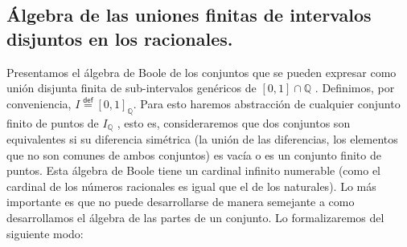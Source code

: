 \documentclass[final,12pt,a4paper,twoside,fleqn]{extbook}
\newcommand{\mathdef}{\ensuremath{\stackrel{\mathsf{def}}{{}={}}}}
\newcommand{\setQ}{\ensuremath{\mathds{Q}}}
\theoremstyle{definition}
\theoremstyle{remark}
\begin{document}
\subsection{Álgebra de las uniones finitas de intervalos disjuntos en los
racionales.}



	Presentamos el álgebra de Boole de los conjuntos que se pueden expresar
como unión disjunta finita de sub-intervalos genéricos de
\(\left[0,1\right]\cap\setQ\) . Definimos, por conveniencia, \(I \mathdef
{\left[ {0,1} \right]}_{\setQ} \). Para esto haremos abstracción de cualquier
conjunto finito de puntos de \(I_{\setQ}\) , esto es, consideraremos que dos
conjuntos son equivalentes si su diferencia simétrica (la unión de las
diferencias, los elementos que no son comunes de ambos conjuntos) es vacía o
es un conjunto finito de puntos. Esta álgebra de Boole tiene un cardinal
infinito numerable (como el cardinal de los números racionales es igual que
el de los naturales). Lo más importante es que no puede desarrollarse de
manera semejante a como desarrollamos el álgebra de las partes de un
conjunto. Lo formalizaremos del siguiente modo:



\newcommand {\powset}[1]{
	\ensuremath{
		\text{
			\large \(\mathscr{P}\) \normalsize 
				\( #1 \)
			}
		}
	}
\newcommand {\IQ} {\ensuremath{{\mathsf{I}}_{\setQ}}}
\newcommand {\IIQ} {\ensuremath{{\mathsf{I}\mathsf{I}}_{\setQ}}}
\newcommand {\IIIQ} {\ensuremath{{\mathsf{I}\mathsf{I}\mathsf{I}}_{\setQ}}}
\newcommand {\IVQ} {\ensuremath{{\mathsf{I}\mathsf{V}}_{\setQ}}}
\newcommand {\FinIQ} {\ensuremath{{\mathsf{Fin}}_{\IQ}}}
\newcommand {\FinDiffRel} {\ensuremath{\!\!\!\!\mod\FinIQ}}
\newcommand {\ClEqFinDiff}[1]{
	\ensuremath{
		{
			\left[\!\left[
				{ #1 }
			\right]\!\right]
		}_{
			\FinDiffRel
		}
	}
}
\newcommand {\QuotSetEqRel}[1]{\ensuremath{#1 \big{/} {\!\!\FinDiffRel}}}
\end{document}

